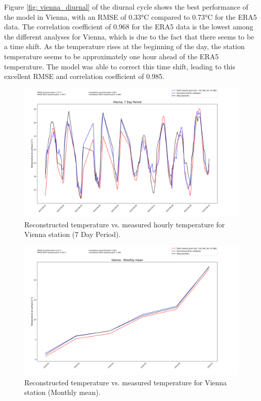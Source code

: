 Figure \ref{fig: vienna_diurnal} of the diurnal cycle shows the best performance of the model in Vienna, with an RMSE of 0.33°C compared to 0.73°C for the ERA5 data.
The correlation coefficient of 0.968 for the ERA5 data is the lowest among the different analyses for Vienna, which is due to the fact that there seems to be a time shift.
As the temperature rises at the beginning of the day, the station temperature seems to be approximately one hour ahead of the ERA5 temperature.
The model was able to correct this time shift, leading to this excellent RMSE and correlation coefficient of 0.985.

\begin{figure}
\centering
\includegraphics[width=1.00\textwidth]{resources/images/charts/vienna_eval_grib_final/Vienna, 7 Day Period_1_2_3.png}
\caption{Reconstructed temperature vs. measured hourly temperature for Vienna station (7 Day Period).}
\label{fig: vienna_7day}
\end{figure}

\begin{figure}
\centering
\includegraphics[width=1.00\textwidth]{resources/images/charts/vienna_eval_grib_final/Vienna - Monthly mean.png}
\caption{Reconstructed temperature vs. measured temperature for Vienna station (Monthly mean).}
\label{fig: vienna_monthly}
\end{figure}

